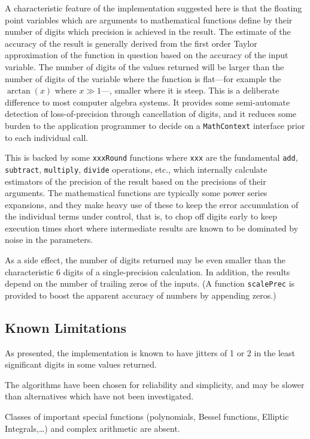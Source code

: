 \documentclass[showpacs,showkeys,amssymb,aps,twocolumn]{revtex4-1}
\begin{document}
A characteristic feature of the implementation suggested here is that
the floating point variables which are arguments to mathematical functions
define by their number of digits
which precision is
achieved in the result. The estimate of the accuracy of the result
is generally derived from the first order Taylor approximation of the function in question
based on the accuracy of the input variable. The number of digits of the
values returned will be larger than the number of digits of the variable where
the function is flat---for example the $\arctan(x)$ where $x\gg 1$---, smaller where it is steep.
This is a deliberate
difference to most computer algebra systems. It provides some semi-automate
detection of loss-of-precision through cancellation of digits, and it 
reduces some burden to the application programmer to decide on a
\texttt{MathContext} interface prior to each individual call.

This is backed by some \texttt{xxxRound} functions where \texttt{xxx}
are the fundamental \texttt{add}, \texttt{subtract}, \texttt{multiply},
\texttt{divide} operations, etc.,
which internally calculate estimators of the precision of the result based on
the precisions of their arguments. The mathematical functions are typically
some power series expansions, and they make heavy use of these to keep
the error accumulation of the individual terms under control, that is, to
chop off digits early to keep execution times short where intermediate results
are known to be dominated by noise in the parameters.

As a side effect, the number of digits returned may be even smaller
than the characteristic 6 digits of a single-precision calculation.
In addition, the results depend on the number of trailing zeros of the inputs.
(A function \texttt{scalePrec} is provided to boost the apparent accuracy
of numbers by appending zeros.)

\subsection{Known Limitations}
As presented, the implementation is known to have jitters of 1 or 2 
in the least significant digits in some values returned.

The algorithms have been chosen for reliability and simplicity,
and may be
slower than alternatives which have not been investigated.

Classes of important special functions (polynomials, Bessel functions, Elliptic Integrals,\ldots)
and complex arithmetic are absent.
\end{document}
